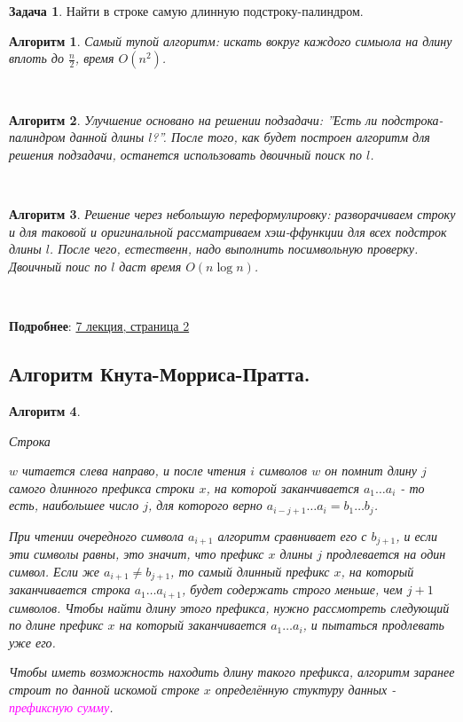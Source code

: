 \documentclass[a4paper]{article}
\theoremstyle{indented}
\newtheorem{alg}{Алгоритм}
\theoremstyle{definition}
\newtheorem{prob}{Задача}
\theoremstyle{remark}
\begin{document}
\begin{prob}
    Найти в строке самую длинную подстроку-палиндром.
\end{prob}

\begin{alg}
    Самый тупой алгоритм: искать вокруг каждого симыола на длину вплоть до $\frac{n}{2}$, время $O(n^2)$. 
\end{alg} \

\begin{alg}
    Улучшение основано на решении подзадачи: ''Есть ли подстрока-палиндром данной длины $l$?''. После того, как будет построен алгоритм для решения подзадачи, останется использовать двоичный поиск по $l$. 
\end{alg} \

\begin{alg}
    Решение через небольшую переформулировку: разворачиваем строку и для таковой и оригинальной рассматриваем хэш-ффункции для всех подстрок длины $l$. После чего, естественн, надо выполнить посимвольную проверку. Двоичный поис по $l$ даст время $O(n\log n)$. 
\end{alg} \

\textbf{Подробнее}: \href{https://users.math-cs.spbu.ru/~okhotin/teaching/algorithms_2020/okhotin_algorithms_2020_l7.pdf}{7 лекция, страница 2}

\subsection{Алгоритм Кнута-Морриса-Пратта.}

\begin{alg}
    \hypertarget{e3}{Строка} $w$ читается слева направо, и после чтения $i$ символов $w$ он помнит длину $j$ самого длинного префикса строки $x$, на которой заканчивается $a_1 \ldots a_i$ - то есть, наибольшее число $j$, для которого верно $a_{i-j+1}\ldots a_i=b_1\ldots b_j$. \ 

    При чтении очередного символа $a_{i+1}$ алгоритм сравнивает его с $b_{j+1}$, и если эти символы равны, это значит, что префикс $x$ длины $j$ продлевается на один символ. Если же $a_{i+1}\neq b_{j+1}$, то самый длинный префикс $x$, на который заканчивается строка $a_1\ldots a_{i+1}$, будет содержать строго меньше, чем $j+1$ символов. Чтобы найти длину этого префикса, нужно рассмотреть следующий по длине префикс $x$ на который заканчивается $a_1\ldots a_i$, и пытаться продлевать уже его. \ 

    Чтобы иметь возможность находить длину такого префикса, алгоритм заранее строит по данной искомой строке $x$ определённую стуктуру данных - \textcolor{magenta}{\hypertarget{d18}{\textit{префиксную сумму}}}.
\end{alg}
\end{document}
